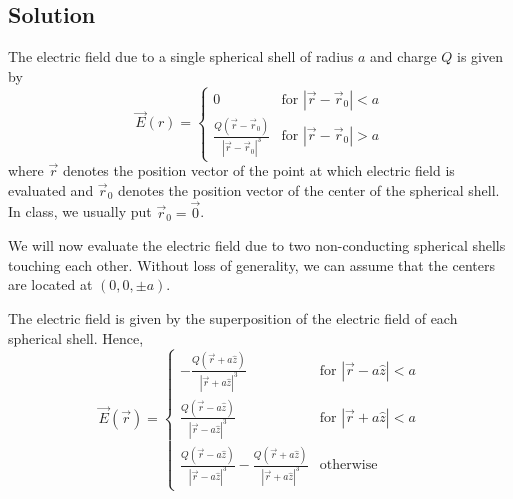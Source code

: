 \documentclass[solutions]{esg8022pset}
\begin{document}
\subsection{Solution}
  The electric field due to a single spherical shell of radius $a$ and charge $Q$ is given by
  $$\vec{E}(r) =
    \begin{cases}
      0  & \text{for }|\vec{r} - \vec{r}_{0}|<a \\
      \frac{Q \left(\vec{r} - \vec{r}_{0}\right)}{|\vec{r} - \vec{r}_{0}|^3} & \text{for }|\vec{r} - \vec{r}_{0}|>a
    \end{cases}
  $$
  where $\vec{r}$ denotes the position vector of the point at which electric field is evaluated and $\vec r_0$ denotes the position vector of the center of the spherical shell.  In class, we usually put $\vec r_0 = \vec 0$.

  We will now evaluate the electric field due to two non-conducting spherical shells touching each other. Without loss of generality, we can assume that the centers are located at $(0,0,\pm a)$.
  \begin{center}
  \end{center}
  The electric field is given by the superposition of the electric field of each spherical shell. Hence,
  $$\vec E(\vec{r}) =
    \begin{cases}
      -\frac{Q \left(\vec{r}  + a \hat z \right)}{|\vec{r} + a \hat z|^3} & \text{for }|\vec{r} - a \hat z| < a \\
      \frac{Q \left(\vec{r}  - a \hat z \right)}{|\vec{r} - a \hat z|^3} & \text{for }|\vec{r} + a \hat z| < a \\
      \frac{Q \left(\vec{r}  - a \hat z \right)}{|\vec{r} - a \hat z|^3} - \frac{Q \left(\vec{r}  + a \hat z \right)}{|\vec{r} + a \hat z|^3} & \text{otherwise}
    \end{cases}
  $$
\end{document}
